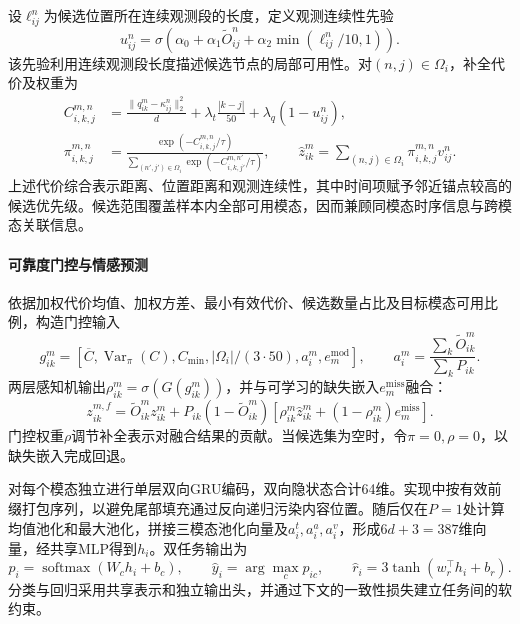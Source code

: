 设$\ell^n_{ij}$为候选位置所在连续观测段的长度，定义观测连续性先验
\begin{equation}
u^n_{ij}=\sigma\left(\alpha_0+\alpha_1\widetilde O^n_{ij}
+\alpha_2\min(\ell^n_{ij}/10,1)\right).
\end{equation}
该先验利用连续观测段长度描述候选节点的局部可用性。对$(n,j)\in\Omega_i$，补全代价及权重为
\begin{align}
C^{m,n}_{i,k,j}&=\frac{\|q^m_{ik}-\kappa^n_{ij}\|_2^2}{d}
+\lambda_t\frac{|k-j|}{50}+\lambda_q(1-u^n_{ij}),\\
\pi^{m,n}_{i,k,j}&=\frac{\exp(-C^{m,n}_{i,k,j}/\tau)}
{\sum_{(n',j')\in\Omega_i}\exp(-C^{m,n'}_{i,k,j'}/\tau)},\qquad
\hat z^m_{ik}=\sum_{(n,j)\in\Omega_i}\pi^{m,n}_{i,k,j}v^n_{ij}.
\end{align}
上述代价综合表示距离、位置距离和观测连续性，其中时间项赋予邻近锚点较高的候选优先级。候选范围覆盖样本内全部可用模态，因而兼顾同模态时序信息与跨模态关联信息。

\paragraph{可靠度门控与情感预测}
依据加权代价均值、加权方差、最小有效代价、候选数量占比及目标模态可用比例，构造门控输入
\begin{equation}
g^m_{ik}=\left[\overline C,\operatorname{Var}_{\pi}(C),C_{\min},
|\Omega_i|/(3\cdot50),a_i^m,e_m^{\mathrm{mod}}\right],\qquad
a_i^m=\frac{\sum_k\widetilde O^m_{ik}}{\sum_kP_{ik}}.
\end{equation}
两层感知机输出$\rho^m_{ik}=\sigma(G(g^m_{ik}))$，并与可学习的缺失嵌入$e_m^{\mathrm{miss}}$融合：
\begin{equation}
z^{m,f}_{ik}=\widetilde O^m_{ik}z^m_{ik}
+P_{ik}(1-\widetilde O^m_{ik})
\left[\rho^m_{ik}\hat z^m_{ik}+(1-\rho^m_{ik})e_m^{\mathrm{miss}}\right].
\end{equation}
门控权重$\rho$调节补全表示对融合结果的贡献。当候选集为空时，令$\pi=0,\rho=0$，以缺失嵌入完成回退。

对每个模态独立进行单层双向GRU编码，双向隐状态合计64维。实现中按有效前缀打包序列，以避免尾部填充通过反向递归污染内容位置。随后仅在$P=1$处计算均值池化和最大池化，拼接三模态池化向量及$a_i^t,a_i^a,a_i^v$，形成$6d+3=387$维向量，经共享MLP得到$h_i$。双任务输出为
\begin{equation}
p_i=\operatorname{softmax}(W_ch_i+b_c),\qquad
\hat y_i=\arg\max_c p_{ic},\qquad
\hat r_i=3\tanh(w_r^\top h_i+b_r).
\end{equation}
分类与回归采用共享表示和独立输出头，并通过下文的一致性损失建立任务间的软约束。

